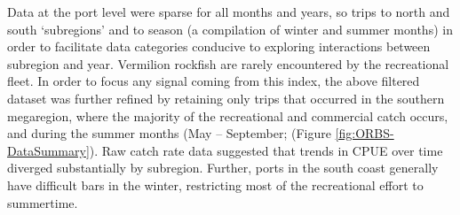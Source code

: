 \documentclass[11pt,
  english,
  a4paper,
]{article}
\begin{document}
\leavevmode\tagmcend\tagstructend


Data at the port level were sparse for all months and years, so trips to north and south `subregions' and to season (a compilation of winter and summer months) in order to facilitate data categories conducive to exploring interactions between subregion and year. Vermilion rockfish are rarely encountered by the recreational fleet. In order to focus any signal coming from this index, the above filtered dataset was further refined by retaining only trips that occurred in the southern megaregion, where the majority of the recreational and commercial catch occurs, and during the summer months (May -- September; (Figure \ref{fig:ORBS-DataSummary}). Raw catch rate data suggested that trends in CPUE over time diverged substantially by subregion. Further, ports in the south coast generally have difficult bars in the winter, restricting most of the recreational effort to summertime.

\leavevmode\tagmcend\tagstructend\par

\end{document}
